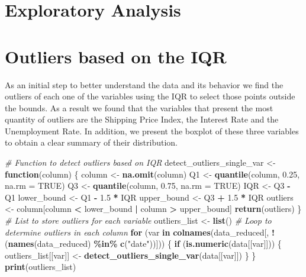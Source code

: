 \documentclass[
]{article}
\newenvironment{Shaded}{\begin{snugshade}}{\end{snugshade}}
\newcommand{\AttributeTok}[1]{\textcolor[rgb]{0.13,0.29,0.53}{#1}}
\newcommand{\CommentTok}[1]{\textcolor[rgb]{0.56,0.35,0.01}{\textit{#1}}}
\newcommand{\ConstantTok}[1]{\textcolor[rgb]{0.56,0.35,0.01}{#1}}
\newcommand{\ControlFlowTok}[1]{\textcolor[rgb]{0.13,0.29,0.53}{\textbf{#1}}}
\newcommand{\FloatTok}[1]{\textcolor[rgb]{0.00,0.00,0.81}{#1}}
\newcommand{\FunctionTok}[1]{\textcolor[rgb]{0.13,0.29,0.53}{\textbf{#1}}}
\newcommand{\NormalTok}[1]{#1}
\newcommand{\OtherTok}[1]{\textcolor[rgb]{0.56,0.35,0.01}{#1}}
\newcommand{\SpecialCharTok}[1]{\textcolor[rgb]{0.81,0.36,0.00}{\textbf{#1}}}
\newcommand{\StringTok}[1]{\textcolor[rgb]{0.31,0.60,0.02}{#1}}
\begin{document}
\section{Exploratory Analysis}\label{exploratory-analysis}

\section{Outliers based on the IQR}\label{outliers-based-on-the-iqr}

As an initial step to better understand the data and its behavior we
find the outliers of each one of the variables using the IQR to select
those points outside the bounds. As a result we found that the variables
that present the most quantity of outliers are the Shipping Price Index,
the Interest Rate and the Unemployment Rate. In addition, we present the
boxplot of these three variables to obtain a clear summary of their
distribution.

\begin{Shaded}
\begin{Highlighting}[]
\CommentTok{\# Function to detect outliers based on IQR}
\NormalTok{detect\_outliers\_single\_var }\OtherTok{\textless{}{-}} \ControlFlowTok{function}\NormalTok{(column) \{}
\NormalTok{  column }\OtherTok{\textless{}{-}} \FunctionTok{na.omit}\NormalTok{(column) }
\NormalTok{  Q1 }\OtherTok{\textless{}{-}} \FunctionTok{quantile}\NormalTok{(column, }\FloatTok{0.25}\NormalTok{, }\AttributeTok{na.rm =} \ConstantTok{TRUE}\NormalTok{)}
\NormalTok{  Q3 }\OtherTok{\textless{}{-}} \FunctionTok{quantile}\NormalTok{(column, }\FloatTok{0.75}\NormalTok{, }\AttributeTok{na.rm =} \ConstantTok{TRUE}\NormalTok{)}
\NormalTok{  IQR }\OtherTok{\textless{}{-}}\NormalTok{ Q3 }\SpecialCharTok{{-}}\NormalTok{ Q1}
\NormalTok{  lower\_bound }\OtherTok{\textless{}{-}}\NormalTok{ Q1 }\SpecialCharTok{{-}} \FloatTok{1.5} \SpecialCharTok{*}\NormalTok{ IQR}
\NormalTok{  upper\_bound }\OtherTok{\textless{}{-}}\NormalTok{ Q3 }\SpecialCharTok{+} \FloatTok{1.5} \SpecialCharTok{*}\NormalTok{ IQR}
\NormalTok{  outliers }\OtherTok{\textless{}{-}}\NormalTok{ column[column }\SpecialCharTok{\textless{}}\NormalTok{ lower\_bound }\SpecialCharTok{|}\NormalTok{ column }\SpecialCharTok{\textgreater{}}\NormalTok{ upper\_bound]}
  \FunctionTok{return}\NormalTok{(outliers)}
\NormalTok{\}}
\CommentTok{\# List to store outliers for each variable}
\NormalTok{outliers\_list }\OtherTok{\textless{}{-}} \FunctionTok{list}\NormalTok{()}
\CommentTok{\# Loop to determine outliers in each column}
\ControlFlowTok{for}\NormalTok{ (var }\ControlFlowTok{in} \FunctionTok{colnames}\NormalTok{(data\_reduced[, }\SpecialCharTok{!}\NormalTok{(}\FunctionTok{names}\NormalTok{(data\_reduced) }\SpecialCharTok{\%in\%} \FunctionTok{c}\NormalTok{(}\StringTok{"date"}\NormalTok{))])) \{}
  \ControlFlowTok{if}\NormalTok{ (}\FunctionTok{is.numeric}\NormalTok{(data[[var]])) \{}
\NormalTok{    outliers\_list[[var]] }\OtherTok{\textless{}{-}} \FunctionTok{detect\_outliers\_single\_var}\NormalTok{(data[[var]])}
\NormalTok{  \}}
\NormalTok{\}}
\FunctionTok{print}\NormalTok{(outliers\_list)}
\end{Highlighting}
\end{Shaded}
\end{document}
